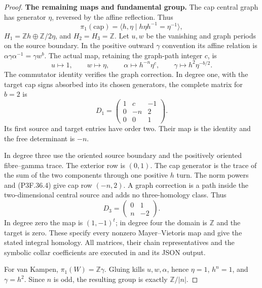 \begin{proof}
\par\medskip\noindent\textbf{The remaining maps and fundamental group.}
The cap central graph has generator \(\eta\), reversed by the
affine reflection. Thus
\[
 \pi_1(\mathrm{cap})=
       \langle h,\eta\mid h\eta h^{-1}=\eta^{-1}\rangle,
\]
\(H_1=\mathbb Zh\oplus\mathbb Z/2\eta\), and
\(H_2=H_3=\mathbb Z\). Let \(u,w\) be the vanishing and
graph periods on the source boundary. In the positive outward
\(\gamma\) convention its affine relation is
\(\alpha\gamma\alpha^{-1}=\gamma w^b\). The actual map,
retaining the graph-path integer \(c\), is
\[
 u\mapsto1,\qquad w\mapsto\eta,\qquad
 \alpha\mapsto h^{-n}\eta^c,\qquad
 \gamma\mapsto h^2\eta^{-b/2}.                               \tag{P3F.36.9}
\]
The commutator identity verifies the graph correction. In degree
one, with the target cap signs absorbed into its chosen generators,
the complete matrix for \(b=2\) is
\[
 D_1=\begin{pmatrix}1&c&-1\\0&-n&2\\0&0&1\end{pmatrix}.
\]
Its first source and target entries have order two. Their map is
the identity and the free determinant is \(-n\).

In degree three use the oriented source boundary and the positively
oriented fibre--gamma trace. The exterior row is \((0,1)\).
The cap generator is the trace of the sum of the two components
through one positive \(h\) turn. The norm powers and
(P3F.36.4) give cap row \((-n,2)\). A graph correction is a
path inside the two-dimensional central source and adds no
three-homology class. Thus
\[
                       D_3=\begin{pmatrix}0&1\\n&-2\end{pmatrix}.
\]
In degree zero the map is \((1,-1)^t\); in degree four the
domain is \(\mathbb Z\) and the target is zero. These specify
every nonzero Mayer--Vietoris map and give the stated integral
homology. All matrices, their chain representatives and the
symbolic collar coefficients are executed in
 and its JSON output.

For van Kampen, \(\pi_1(W)=\mathbb Z\gamma\). Gluing kills
\(u,w,\alpha\), hence \(\eta=1\), \(h^n=1\), and
\(\gamma=h^2\). Since \(n\) is odd, the resulting group is
exactly \(\mathbb Z/|n|\).


\end{proof}
